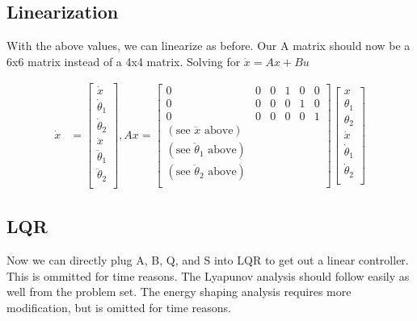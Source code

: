 \documentclass[conference]{IEEEtran}
\begin{document}
\subsection{Linearization}

With the above values, we can linearize as before. Our A matrix should now be a
6x6 matrix instead of a 4x4 matrix. Solving for  $\dot x = A x + B u$

\begin{align}
    \dot x &=
    \begin{bmatrix}
        \dot x \\
        \dot \theta_1 \\
        \dot \theta_2 \\
        \ddot x \\
        \ddot \theta_1 \\
        \ddot \theta_2 \\
    \end{bmatrix},
    Ax = 
    \begin{bmatrix}
        0 & 0 & 0 & 1 & 0 & 0 \\
        0 & 0 & 0 & 0 & 1 & 0 \\
        0 & 0 & 0 & 0 & 0 & 1 \\
        (\text{see } \ddot x \text{ above}) \\
        (\text{see } \ddot \theta_1 \text{ above}) \\
        (\text{see } \ddot \theta_2  \text{ above}) \\
    \end{bmatrix} 
    \begin{bmatrix}
        x \\
        \theta_1 \\
        \theta_2 \\
        \dot x \\
        \dot \theta_1 \\
        \dot \theta_2 \\
    \end{bmatrix}
\end{align}


\subsection{LQR}

Now we can directly plug A, B, Q, and S into LQR to get out a linear controller.
This is ommitted for time reasons. The Lyapunov analysis should follow easily as
well from the problem set. The energy shaping analysis requires more
modification, but is omitted for time reasons.
\end{document}
